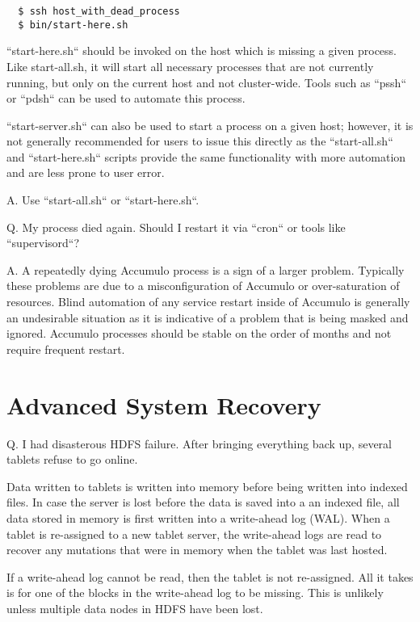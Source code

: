 \small
\begin{verbatim}
  $ ssh host_with_dead_process
  $ bin/start-here.sh
\end{verbatim}
\normalsize

``start-here.sh`` should be invoked on the host which is missing a given process. Like start-all.sh, it will start all
necessary processes that are not currently running, but only on the current host and not cluster-wide. Tools such as ``pssh`` or 
``pdsh`` can be used to automate this process.

``start-server.sh`` can also be used to start a process on a given host; however, it is not generally recommended for
users to issue this directly as the ``start-all.sh`` and ``start-here.sh`` scripts provide the same functionality with
more automation and are less prone to user error.

A. Use ``start-all.sh`` or ``start-here.sh``.

Q. My process died again. Should I restart it via ``cron`` or tools like ``supervisord``?

A. A repeatedly dying Accumulo process is a sign of a larger problem. Typically these problems are due to a
misconfiguration of Accumulo or over-saturation of resources. Blind automation of any service restart inside of Accumulo
is generally an undesirable situation as it is indicative of a problem that is being masked and ignored. Accumulo
processes should be stable on the order of months and not require frequent restart.


\section{Advanced System Recovery}

Q. I had disasterous HDFS failure.  After bringing everything back up, several tablets refuse to go online.

Data written to tablets is written into memory before being written into indexed files.  In case the server
is lost before the data is saved into a an indexed file, all data stored in memory is first written into a
write-ahead log (WAL).  When a tablet is re-assigned to a new tablet server, the write-ahead logs are read to
recover any mutations that were in memory when the tablet was last hosted.

If a write-ahead log cannot be read, then the tablet is not re-assigned.  All it takes is for one of
the blocks in the write-ahead log to be missing.  This is unlikely unless multiple data nodes in HDFS have been
lost.

